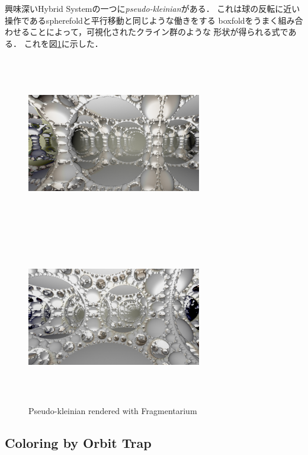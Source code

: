 興味深いHybrid Systemの一つに\textit{pseudo-kleinian}がある．
これは球の反転に近い操作であるspherefoldと平行移動と同じような働きをする
boxfoldをうまく組み合わせることによって，可視化されたクライン群のような
形状が得られる式である．
これを図\ref{fig:pseudoKleinian}に示した．

\begin{figure}[htbp]
 \begin{minipage}{0.5\hsize}
  \center
  \includegraphics[width=3in, height=3in, keepaspectratio]{../img/fractal/pseudoKleinian.pdf}
  \subcaption{}
 \end{minipage}
 \begin{minipage}{0.5\hsize}
  \center
  \includegraphics[width=3in, height=3in,
  keepaspectratio]{../img/fractal/pseudo-kleinian2.pdf}
  \subcaption{}
 \end{minipage}
  \caption{Pseudo-kleinian rendered with Fragmentarium}
  \label{fig:pseudoKleinian}
\end{figure}


\subsection{Coloring by Orbit Trap}

